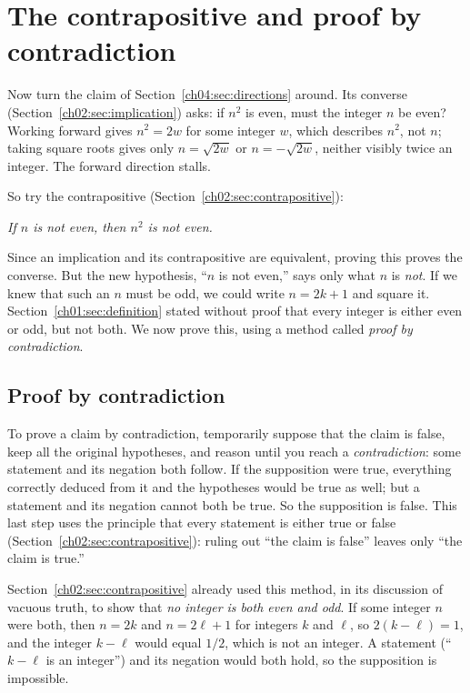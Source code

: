 \section{The contrapositive and proof by contradiction}\label{ch04:sec:contrapositive}
Now turn the claim of Section~\ref{ch04:sec:directions} around. Its converse (Section~\ref{ch02:sec:implication}) asks: if $n^2$ is even, must the integer $n$ be even? Working forward gives $n^2=2w$ for some integer $w$, which describes $n^2$, not $n$; taking square roots gives only $n=\sqrt{2w}$ or $n=-\sqrt{2w}$, neither visibly twice an integer. The forward direction stalls.

So try the contrapositive (Section~\ref{ch02:sec:contrapositive}):
\begin{center}
\emph{If $n$ is not even, then $n^2$ is not even.}
\end{center}
Since an implication and its contrapositive are equivalent, proving this proves the converse. But the new hypothesis, ``$n$ is not even,'' says only what $n$ is \emph{not}. If we knew that such an $n$ must be odd, we could write $n=2k+1$ and square it. Section~\ref{ch01:sec:definition} stated without proof that every integer is either even or odd, but not both. We now prove this, using a method called \emph{proof by contradiction}.

\subsection*{Proof by contradiction}
To prove a claim by contradiction, temporarily suppose that the claim is false, keep all the original hypotheses, and reason until you reach a \emph{contradiction}: some statement and its negation both follow. If the supposition were true, everything correctly deduced from it and the hypotheses would be true as well; but a statement and its negation cannot both be true. So the supposition is false. This last step uses the principle that every statement is either true or false (Section~\ref{ch02:sec:contrapositive}): ruling out ``the claim is false'' leaves only ``the claim is true.''

Section~\ref{ch02:sec:contrapositive} already used this method, in its discussion of vacuous truth, to show that \emph{no integer is both even and odd}. If some integer $n$ were both, then $n=2k$ and $n=2\ell+1$ for integers $k$ and $\ell$, so $2(k-\ell)=1$, and the integer $k-\ell$ would equal $1/2$, which is not an integer. A statement (``$k-\ell$ is an integer'') and its negation would both hold, so the supposition is impossible.

